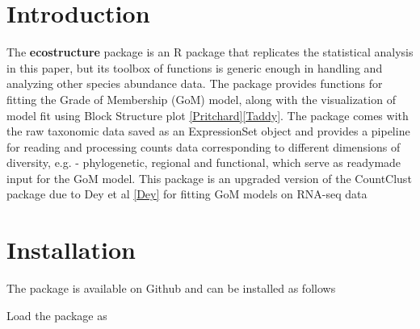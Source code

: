 \documentclass[12pt]{article}
\begin{document}
\maketitle

\section{Introduction}

The \textbf{ecostructure} package is an R package that replicates the statistical analysis in this paper, but its toolbox of functions is generic enough in handling and analyzing other species abundance data. The package provides functions for fitting the Grade of Membership (GoM) model, along with the visualization of model fit using Block Structure plot \ref{Pritchard}\ref{Taddy}. The package comes with the raw taxonomic data saved as an ExpressionSet object and provides a pipeline for reading and processing counts data corresponding to different dimensions of diversity, e.g. - phylogenetic, regional and functional, which serve as readymade input for the GoM model. This package is an upgraded version of the CountClust package due to Dey et al \ref{Dey} for fitting GoM models on RNA-seq data

\section{Installation}

The package is available on Github and can be installed as follows



\begin{knitrout}
\color{fgcolor}\begin{kframe}
\begin{alltt}
\hlstd{(}\hlstd{)}
\end{alltt}
\end{kframe}
\end{knitrout}

Load the package as
\end{document}
